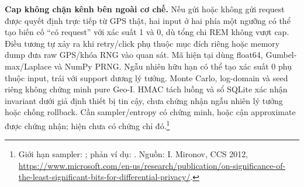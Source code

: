 \textbf{Cap không chặn kênh bên ngoài cơ chế.} Nếu gửi hoặc không gửi
request được quyết định trực tiếp từ GPS thật, hai input ở hai phía một
ngưỡng có thể tạo biến cố ``có request'' với xác suất 1 và 0, dù tổng chi
REM không vượt cap. Điều tương tự xảy ra khi retry/click phụ thuộc mục
đích riêng hoặc memory dump đưa raw GPS/khóa RNG vào quan sát. 
Mã hiện tại dùng float64, Gumbel-max/Laplace và NumPy PRNG. Ngẫu nhiên hữu hạn có thể tạo xác suất 0 phụ thuộc input, trái với support dương lý tưởng. Monte Carlo, log-domain và seed riêng không chứng minh pure Geo-I. HMAC tách luồng và sổ SQLite xác nhận invariant dưới giả định thiết bị tin cậy, chưa chứng nhận ngẫu nhiên lý tưởng hoặc chống rollback. Cần sampler/entropy có chứng minh, hoặc cận approximate được chứng nhận; hiện chưa có chứng chỉ đó.\footnote{Giới hạn sampler: ; phản ví dụ: . Nguồn: I. Mironov, CCS 2012, \url{https://www.microsoft.com/en-us/research/publication/on-significance-of-the-least-significant-bits-for-differential-privacy/}.}
